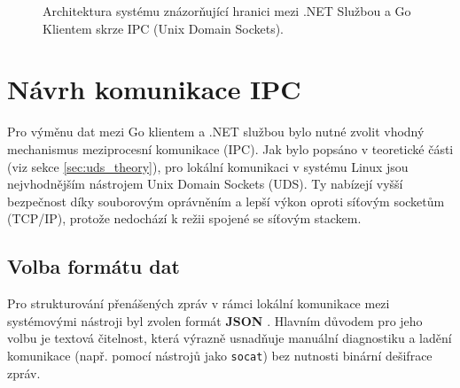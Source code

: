 \begin{figure}[H]
    \caption{Architektura systému znázorňující hranici mezi .NET Službou a Go Klientem skrze IPC (Unix Domain Sockets).}
    \label{fig:architecture_ipc}
\end{figure}


\section{Návrh komunikace IPC}
\label{sec:navrh_ipc}
Pro výměnu dat mezi Go klientem a .NET službou bylo nutné zvolit vhodný mechanismus meziprocesní komunikace (IPC). Jak bylo popsáno v teoretické části (viz sekce \ref{sec:uds_theory}), pro lokální komunikaci v systému Linux jsou nejvhodnějším nástrojem Unix Domain Sockets (UDS). Ty nabízejí vyšší bezpečnost díky souborovým oprávněním a lepší výkon oproti síťovým socketům (TCP/IP), protože nedochází k režii spojené se síťovým stackem.

\subsection{Volba formátu dat}
Pro strukturování přenášených zpráv v rámci lokální komunikace mezi systémovými nástroji byl zvolen formát \textbf{JSON} \cite{rfc_json}. Hlavním důvodem pro jeho volbu je textová čitelnost, která výrazně usnadňuje manuální diagnostiku a ladění komunikace (např. pomocí nástrojů jako \texttt{socat}) bez nutnosti binární dešifrace zpráv.


